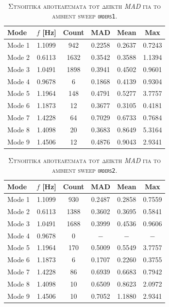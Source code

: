 \documentclass[a4paper,12pt,twoside,openright]{report}
\begin{document}
\begin{table}[!t]
\centering
\caption{\textsc{Συνοπτικά αποτελέσματα του δείκτη \textit{MAD} για το ambient sweep \texttt{orders1}.}}
\label{tab:mad_summary_ambient_orders1}
\small
\renewcommand{\arraystretch}{1.2}
\setlength{\tabcolsep}{5pt}
\begin{tabular}{lccccc}
\toprule
\textbf{Mode} & \textbf{$f$ [Hz]} & \textbf{Count} & \textbf{MAD} & \textbf{Mean} & \textbf{Max} \\
\midrule
Mode 1 & 1.1099 & 942  & 0.2258 & 0.2637 & 0.7243 \\
Mode 2 & 0.6113 & 1632 & 0.3542 & 0.3588 & 1.1394 \\
Mode 3 & 1.0491 & 1898 & 0.3941 & 0.4502 & 0.9601 \\
Mode 4 & 0.9678 & 6    & 0.1868 & 0.4139 & 0.9304 \\
Mode 5 & 1.1964 & 148  & 0.4791 & 0.5277 & 3.7757 \\
Mode 6 & 1.1873 & 12   & 0.3677 & 0.3105 & 0.4181 \\
Mode 7 & 1.4228 & 64   & 0.7029 & 0.6733 & 0.7684 \\
Mode 8 & 1.4098 & 20   & 0.3683 & 0.8649 & 5.3164 \\
Mode 9 & 1.4506 & 12   & 0.4876 & 0.9043 & 2.9341 \\
\bottomrule
\end{tabular}
\end{table}

\begin{table}[!t]
\centering
\caption{\textsc{Συνοπτικά αποτελέσματα του δείκτη \textit{MAD} για το ambient sweep \texttt{orders2}.}}
\label{tab:mad_summary_ambient_orders2}
\small
\renewcommand{\arraystretch}{1.2}
\setlength{\tabcolsep}{5pt}
\begin{tabular}{lccccc}
\toprule
\textbf{Mode} & \textbf{$f$ [Hz]} & \textbf{Count} & \textbf{MAD} & \textbf{Mean} & \textbf{Max} \\
\midrule
Mode 1 & 1.1099 & 930  & 0.2487 & 0.2858 & 0.7559 \\
Mode 2 & 0.6113 & 1388 & 0.3602 & 0.3695 & 0.5841 \\
Mode 3 & 1.0491 & 1688 & 0.3999 & 0.4536 & 0.9606 \\
Mode 4 & 0.9678 & 0    & $-$     & $-$     & $-$     \\
Mode 5 & 1.1964 & 170  & 0.5009 & 0.5549 & 3.7757 \\
Mode 6 & 1.1873 & 6    & 0.1707 & 0.2260 & 0.3755 \\
Mode 7 & 1.4228 & 86   & 0.6939 & 0.6683 & 0.7942 \\
Mode 8 & 1.4098 & 10   & 0.6509 & 0.8623 & 2.0972 \\
Mode 9 & 1.4506 & 10   & 0.7052 & 1.1880 & 2.9341 \\
\bottomrule
\end{tabular}
\end{table}
\end{document}
